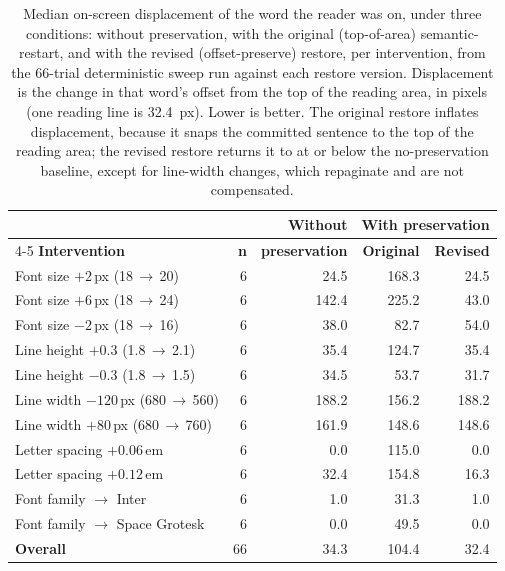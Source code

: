 \begin{table}[htbp]
\centering
\small
\caption[Reading-position displacement under three restore conditions.]{Median on-screen displacement of the word the reader was on, under three conditions: without preservation, with the original (top-of-area) semantic-restart, and with the revised (offset-preserve) restore, per intervention, from the 66-trial deterministic sweep run against each restore version. Displacement is the change in that word's offset from the top of the reading area, in pixels (one reading line is \SI{32.4}{px}). Lower is better. The original restore inflates displacement, because it snaps the committed sentence to the top of the reading area; the revised restore returns it to at or below the no-preservation baseline, except for line-width changes, which repaginate and are not compensated.}
\label{tab:eval-displacement}
\begin{tabular}{l r r r r}
\toprule
 & & \textbf{Without} & \multicolumn{2}{c}{\textbf{With preservation}} \\
\cmidrule(lr){4-5}
\textbf{Intervention} & \textbf{n} & \textbf{preservation} & \textbf{Original} & \textbf{Revised} \\
\midrule
Font size $+2$\,px (18\,$\to$\,20)      & 6 & 24.5  & 168.3 & 24.5  \\
Font size $+6$\,px (18\,$\to$\,24)      & 6 & 142.4 & 225.2 & 43.0  \\
Font size $-2$\,px (18\,$\to$\,16)      & 6 & 38.0  & 82.7  & 54.0  \\
Line height $+0.3$ (1.8\,$\to$\,2.1)    & 6 & 35.4  & 124.7 & 35.4  \\
Line height $-0.3$ (1.8\,$\to$\,1.5)    & 6 & 34.5  & 53.7  & 31.7  \\
Line width $-120$\,px (680\,$\to$\,560) & 6 & 188.2 & 156.2 & 188.2 \\
Line width $+80$\,px (680\,$\to$\,760)  & 6 & 161.9 & 148.6 & 148.6 \\
Letter spacing $+0.06$\,em              & 6 & 0.0   & 115.0 & 0.0   \\
Letter spacing $+0.12$\,em              & 6 & 32.4  & 154.8 & 16.3  \\
Font family $\to$ Inter                 & 6 & 1.0   & 31.3  & 1.0   \\
Font family $\to$ Space Grotesk         & 6 & 0.0   & 49.5  & 0.0   \\
\midrule
\textbf{Overall}                        & 66 & 34.3 & 104.4 & 32.4 \\
\bottomrule
\end{tabular}
\end{table}
